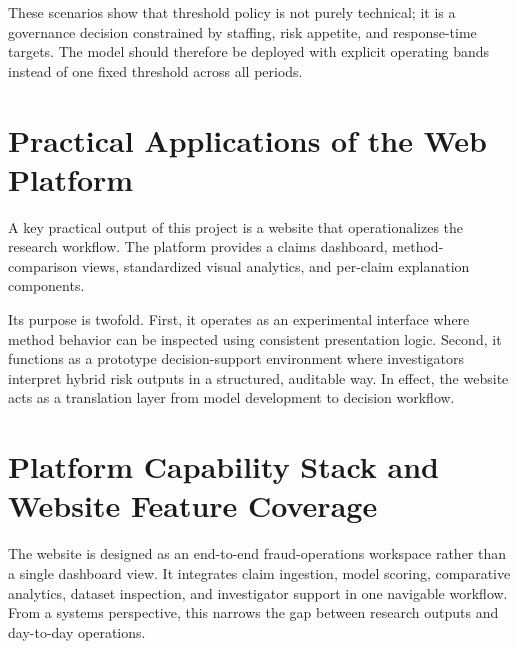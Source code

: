 \documentclass[12pt,a4paper]{report}
\begin{document}
These scenarios show that threshold policy is not purely technical; it is a governance decision constrained by staffing, risk appetite, and response-time targets. The model should therefore be deployed with explicit operating bands instead of one fixed threshold across all periods.

\section{Practical Applications of the Web Platform}
A key practical output of this project is a website that operationalizes the research workflow. The platform provides a claims dashboard, method-comparison views, standardized visual analytics, and per-claim explanation components.

Its purpose is twofold. First, it operates as an experimental interface where method behavior can be inspected using consistent presentation logic. Second, it functions as a prototype decision-support environment where investigators interpret hybrid risk outputs in a structured, auditable way. In effect, the website acts as a translation layer from model development to decision workflow.

\section{Platform Capability Stack and Website Feature Coverage}
The website is designed as an end-to-end fraud-operations workspace rather than a single dashboard view. It integrates claim ingestion, model scoring, comparative analytics, dataset inspection, and investigator support in one navigable workflow. From a systems perspective, this narrows the gap between research outputs and day-to-day operations.
\end{document}
